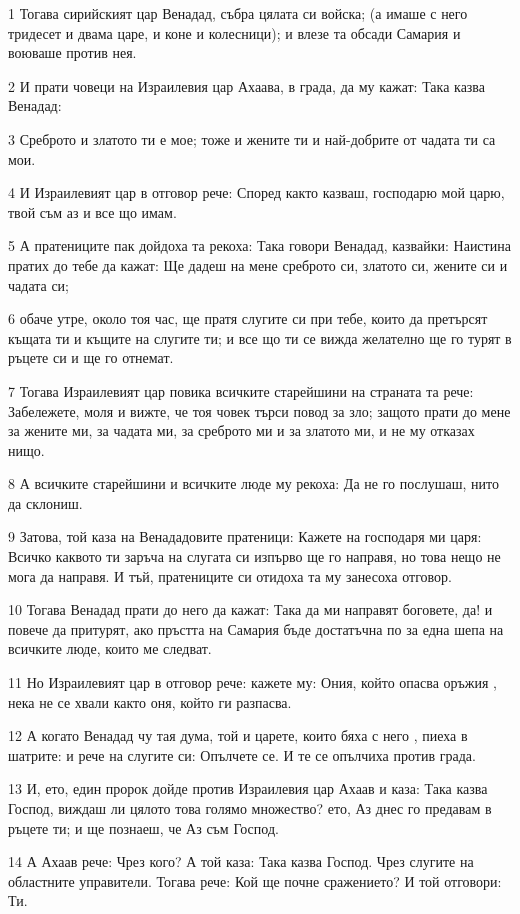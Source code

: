 \par 1 Тогава сирийският цар Венадад, събра цялата си войска; (а имаше с него тридесет и двама царе, и коне и колесници); и влезе та обсади Самария и воюваше против нея.
\par 2 И прати човеци на Израилевия цар Ахаава, в града, да му кажат: Така казва Венадад:
\par 3 Среброто и златото ти е мое; тоже и жените ти и най-добрите от чадата ти са мои.
\par 4 И Израилевият цар в отговор рече: Според както казваш, господарю мой царю, твой съм аз и все що имам.
\par 5 А пратениците пак дойдоха та рекоха: Така говори Венадад, казвайки: Наистина пратих до тебе да кажат: Ще дадеш на мене среброто си, златото си, жените си и чадата си;
\par 6 обаче утре, около тоя час, ще пратя слугите си при тебе, които да претърсят къщата ти и къщите на слугите ти; и все що ти се вижда желателно ще го турят в ръцете си и ще го отнемат.
\par 7 Тогава Израилевият цар повика всичките старейшини на страната та рече: Забележете, моля и вижте, че тоя човек търси повод за зло; защото прати до мене за жените ми, за чадата ми, за среброто ми и за златото ми, и не му отказах нищо.
\par 8 А всичките старейшини и всичките люде му рекоха: Да не го послушаш, нито да склониш.
\par 9 Затова, той каза на Венададовите пратеници: Кажете на господаря ми царя: Всичко каквото ти заръча на слугата си изпърво ще го направя, но това нещо не мога да направя. И тъй, пратениците си отидоха та му занесоха отговор.
\par 10 Тогава Венадад прати до него да кажат: Така да ми направят боговете, да! и повече да притурят, ако пръстта на Самария бъде достатъчна по за една шепа на всичките люде, които ме следват.
\par 11 Но Израилевият цар в отговор рече: кажете му: Ония, който опасва оръжия , нека не се хвали както оня, който ги разпасва.
\par 12 А когато Венадад чу тая дума, той и царете, които бяха с него , пиеха в шатрите: и рече на слугите си: Опълчете се. И те се опълчиха против града.
\par 13 И, ето, един пророк дойде против Израилевия цар Ахаав и каза: Така казва Господ, виждаш ли цялото това голямо множество? ето, Аз днес го предавам в ръцете ти; и ще познаеш, че Аз съм Господ.
\par 14 А Ахаав рече: Чрез кого? А той каза: Така казва Господ. Чрез слугите на областните управители. Тогава рече: Кой ще почне сражението? И той отговори: Ти.
